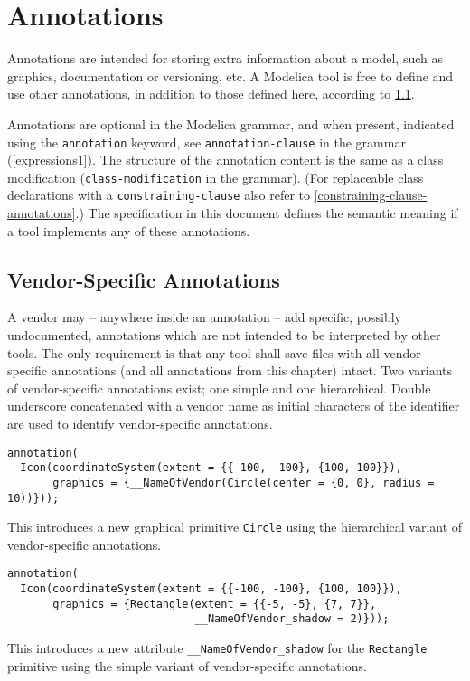 \chapter{Annotations}\label{annotations}

Annotations are intended for storing extra information about a model, such as graphics, documentation or versioning, etc.
A Modelica tool is free to define and use other annotations, in addition to those defined here, according to \cref{vendor-specific-annotations}.

Annotations are optional in the Modelica grammar, and when present, indicated using the \lstinline!annotation! keyword, see \lstinline[language=grammar]!annotation-clause! in the grammar (\cref{expressions1}).
The structure of the annotation content is the same as a class modification (\lstinline[language=grammar]!class-modification! in the grammar).
(For replaceable class declarations with a \lstinline[language=grammar]!constraining-clause! also refer to \cref{constraining-clause-annotations}.)
The specification in this document defines the semantic meaning if a tool implements any of these annotations.

\section{Vendor-Specific Annotations}\label{vendor-specific-annotations}

A vendor may -- anywhere inside an annotation -- add specific, possibly undocumented, annotations which are not intended to be interpreted by other tools.
The only requirement is that any tool shall save files with all vendor-specific annotations (and all annotations from this chapter) intact.
Two variants of vendor-specific annotations exist; one simple and one hierarchical.
Double underscore concatenated with a vendor name as initial characters of the identifier are used to identify vendor-specific annotations.

\begin{example}
\begin{lstlisting}[language=modelica]
annotation(
  Icon(coordinateSystem(extent = {{-100, -100}, {100, 100}}),
       graphics = {__NameOfVendor(Circle(center = {0, 0}, radius = 10))}));
\end{lstlisting}
This introduces a new graphical primitive \lstinline!Circle! using the
hierarchical variant of vendor-specific annotations.
\begin{lstlisting}[language=modelica]
annotation(
  Icon(coordinateSystem(extent = {{-100, -100}, {100, 100}}),
       graphics = {Rectangle(extent = {{-5, -5}, {7, 7}},
                             __NameOfVendor_shadow = 2)}));
\end{lstlisting}
This introduces a new attribute \lstinline!__NameOfVendor_shadow!
for the \lstinline!Rectangle! primitive using the simple variant of
vendor-specific annotations.
\end{example}

